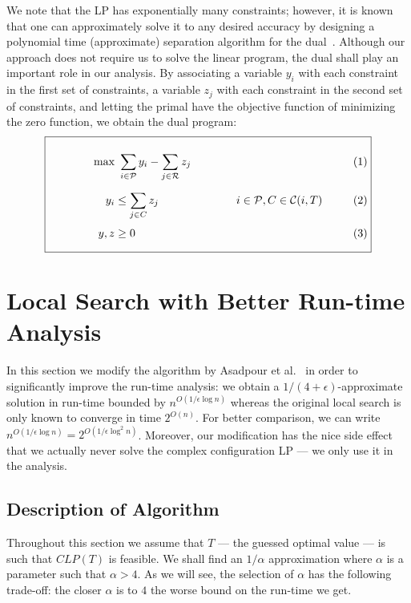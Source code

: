\documentclass{llncs}
\newcommand{\res}{\ensuremath{\mathcal{R}}\xspace}
\newcommand{\players}{\ensuremath{\mathcal{P}}\xspace}
\newcommand{\conf}[1]{\ensuremath{\mathcal{C}(#1)}}
\begin{document}
We note that the LP has exponentially many constraints; however, it is
known that one can approximately solve it to any desired
accuracy by designing a polynomial time (approximate) separation algorithm for the
dual~\cite{BS06}. Although our approach does not require us to solve the linear
program, the dual shall play an important role in our analysis.  By
associating a variable $y_i$ with each constraint in the first set of
constraints, a variable $z_j$ with each constraint in the second set of
constraints, and letting the primal have the objective function of
minimizing the zero function, we obtain the dual program:
\begin{equation*}
\boxed{\begin{minipage}{10cm}\begin{align*}
            \max & \mbox{  } \sum_{i\in \players} y_i - \sum_{j\in \res} z_j  && \\[2mm]
            y_i &\leq             \sum_{j\in C} z_j &  i\in \players, C \in
            \conf{i, T}\\[1mm]
            y,z & \geq 0
          \end{align*}
          \vspace{-0.4cm}
        \end{minipage}}
\end{equation*}
\section{Local Search with Better Run-time Analysis}

In this section we modify the algorithm by Asadpour et
al.~\cite{AFS08} in order to significantly improve the run-time
analysis: we obtain a $1/(4+\epsilon)$-approximate solution in
run-time bounded by $n^{O(1/\epsilon \log n)}$ whereas the original
local search is only known to converge in time $2^{O(n)}$. For better
comparison, we can write $n^{O(1/\epsilon \log n)} = 2^{O(1/\epsilon
  \log^2 n)}$. Moreover, our modification has the nice side effect
that we actually never solve the complex configuration LP --- we only
use it in the analysis.

\subsection{Description of Algorithm}
\label{sec:algodesc}
Throughout this section we assume that $T$ --- the guessed optimal value --- is such that $CLP(T)$ is feasible. We
shall find an $1/\alpha$ approximation where $\alpha$ is a parameter such that
$\alpha>4$. As we will see, the selection of $\alpha$ has the following
trade-off: the closer $\alpha$ is to $4$ the worse bound on the run-time we get.
\end{document}
